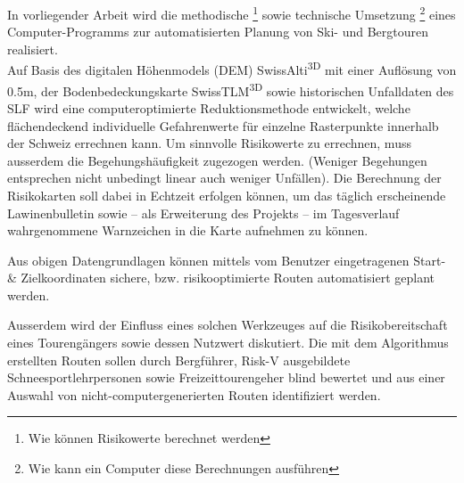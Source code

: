 In vorliegender Arbeit wird die methodische \footnote{Wie können Risikowerte berechnet werden} sowie technische Umsetzung \footnote{Wie kann ein Computer diese Berechnungen ausführen} eines Computer-Programms zur automatisierten Planung von Ski- und Bergtouren realisiert. 
\\
Auf Basis des digitalen Höhenmodels (DEM) SwissAlti\textsuperscript{3D} mit einer Auflösung von 0.5m, der Bodenbedeckungskarte SwissTLM\textsuperscript{3D} sowie historischen Unfalldaten des SLF wird eine computeroptimierte Reduktionsmethode entwickelt, welche flächendeckend individuelle Gefahrenwerte für einzelne Rasterpunkte innerhalb der Schweiz errechnen kann. Um sinnvolle Risikowerte zu errechnen, muss ausserdem die Begehungshäufigkeit zugezogen werden. (Weniger Begehungen entsprechen nicht unbedingt linear auch weniger Unfällen). Die Berechnung der Risikokarten soll dabei in Echtzeit erfolgen können, um das täglich erscheinende Lawinenbulletin sowie – als Erweiterung des Projekts – im Tagesverlauf wahrgenommene Warnzeichen in die Karte aufnehmen zu können.

Aus obigen Datengrundlagen können mittels vom Benutzer eingetragenen Start- \& Zielkoordinaten sichere, bzw. risikooptimierte Routen automatisiert geplant werden.

Ausserdem wird der Einfluss eines solchen Werkzeuges auf die Risikobereitschaft eines Tourengängers sowie dessen Nutzwert diskutiert. Die mit dem Algorithmus erstellten Routen sollen durch Bergführer, Risk-V ausgebildete Schneesportlehrpersonen sowie Freizeittourengeher blind bewertet und aus einer Auswahl von nicht-computergenerierten Routen identifiziert werden.
	